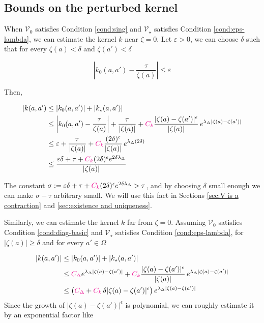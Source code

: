 \documentclass{article}
\theoremstyle{plain}
\newcommand{\hardpart}{\mathcal{V}_0}
\newcommand{\softpart}{\mathcal{V}_\star}
\newcommand{\hardker}{k_0}
\newcommand{\softker}{k_\star}
\begin{document}
\subsection{Bounds on the perturbed kernel}\label{sec:bounds on k}
 When $\hardpart$ satisfies Condition \eqref{cond:sing} and $\softpart$ satisfies Condition \eqref{cond:eps-lambda}, we can estimate the kernel $k$ near $\zeta=0$. Let $\varepsilon>0$, we can choose $\delta$ such that for every $\zeta(a)<\delta$ and $\zeta(a') <\delta$

\[ \left\vert\hardker(a,a')-\frac{\tau}{\zeta(a)} \right\vert \leq \varepsilon\]

Then, 

\begin{align*}
    |k(a,a')&\leq |\hardker(a,a')| + |\softker(a,a')|\\
    &\leq \left\vert\hardker(a,a')-\frac{\tau}{\zeta(a)} \right\vert +\frac{\tau}{|\zeta(a)|} +\textcolor{magenta}{C_k}\frac{|\zeta(a)-\zeta(a')|^\epsilon}{|\zeta(a)|}\,e^{\lambda_\Delta|\zeta(a)-\zeta(a')|}\\
    &\leq \varepsilon +\frac{\tau}{|\zeta(a)|} + \textcolor{magenta}{C_k}\frac{(2\delta)^\epsilon}{|\zeta(a)|}\,e^{\lambda_\Delta (2\delta)}\\
    &\leq \frac{\varepsilon\delta+\tau+ \textcolor{magenta}{C_k} (2\delta)^\epsilon e^{2\delta \lambda_\Delta} }{|\zeta(a)|}
\end{align*}

The constant $\sigma:=\varepsilon\delta+\tau+ \textcolor{magenta}{C_k} (2\delta)^\epsilon e^{2\delta \lambda_\Delta} > \tau $, and by choosing $\delta$ small enough we can make $\sigma-\tau$ arbitrary small. We will use this fact in Sections \ref{sec:V is a contraction} and \ref{sec:existence and uniqueness}.

Similarly, we can estimate the kernel $k$ far from $\zeta=0$. Assuming $\hardpart$ satisfies Condition \eqref{cond:diag-basic} and $\softpart$ satisfies Condition \eqref{cond:eps-lambda}, for $|\zeta(a)|\geq \delta$ and for every $a'\in\Omega$

\begin{align*}
    |k(a,a')|&\leq |\hardker(a,a')| + |\softker(a,a')|\\
    &\leq \textcolor{magenta}{C_\Delta} e^{\lambda_\Delta |\zeta(a)-\zeta(a')|} +\textcolor{magenta}{C_k}\frac{|\zeta(a)-\zeta(a')|^\epsilon}{|\zeta(a)|}\,e^{\lambda_\Delta|\zeta(a)-\zeta(a')|}\\
    &\leq \big(\textcolor{magenta}{C_\Delta} + \textcolor{magenta}{C_k}\, \delta |\zeta(a)-\zeta(a')|^\epsilon \big) \, e^{\lambda_\Delta|\zeta(a)-\zeta(a')|}
\end{align*}
Since the growth of $|\zeta(a)-\zeta(a')|^\epsilon$ is polynomial, we can roughly estimate it by an exponential factor like 
\end{document}
